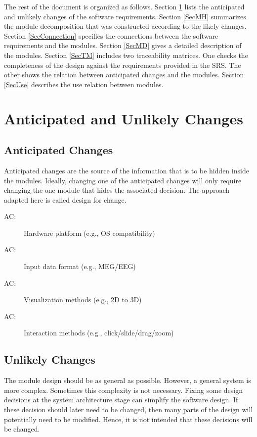\documentclass[12pt, titlepage]{article}
\newcounter{acnum}
\newcommand{\actheacnum}{AC\theacnum}
\begin{document}
The rest of the document is organized as follows. Section
\ref{SecChange} lists the anticipated and unlikely changes of the software
requirements. Section \ref{SecMH} summarizes the module decomposition that
was constructed according to the likely changes. Section \ref{SecConnection}
specifies the connections between the software requirements and the
modules. Section \ref{SecMD} gives a detailed description of the
modules. Section \ref{SecTM} includes two traceability matrices. One checks
the completeness of the design against the requirements provided in the SRS. The
other shows the relation between anticipated changes and the modules. Section
\ref{SecUse} describes the use relation between modules.

\section{Anticipated and Unlikely Changes} \label{SecChange}
\subsection{Anticipated Changes} \label{SecAchange}

Anticipated changes are the source of the information that is to be hidden
inside the modules. Ideally, changing one of the anticipated changes will only
require changing the one module that hides the associated decision. The approach
adapted here is called design for
change.

\begin{description}
\item[ \actheacnum \label{acHardware}:] Hardware platform (e.g., OS compatibility)
\item[ \actheacnum \label{acInput}:] Input data format (e.g., MEG/EEG)
\item[ \actheacnum \label{acVisualization}:] Visualization methods (e.g., 2D to 3D)
\item[ \actheacnum \label{acInteraction}:] Interaction methods (e.g., click/slide/drag/zoom)
\end{description}


\subsection{Unlikely Changes} \label{SecUchange}

The module design should be as general as possible. However, a general system is
more complex. Sometimes this complexity is not necessary. Fixing some design
decisions at the system architecture stage can simplify the software design. If
these decision should later need to be changed, then many parts of the design
will potentially need to be modified. Hence, it is not intended that these
decisions will be changed.
\end{document}
